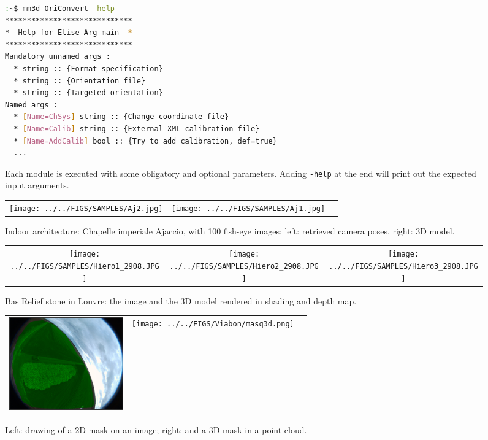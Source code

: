 \documentclass[twocolumn]{bmcart}%
\begin{document}
\begin{backmatter}
%
\footnotesize
\begin{figure}[h!]
\begin{lstlisting}[language=bash,frame=none]
:~$ mm3d OriConvert -help
*****************************
*  Help for Elise Arg main  *
*****************************
Mandatory unnamed args : 
  * string :: {Format specification}
  * string :: {Orientation file}
  * string :: {Targeted orientation}
Named args : 
  * [Name=ChSys] string :: {Change coordinate file}
  * [Name=Calib] string :: {External XML calibration file}
  * [Name=AddCalib] bool :: {Try to add calibration, def=true}
  ...
\end{lstlisting}
\caption{ {Each module is executed with some obligatory and optional parameters. Adding {\tt -help} at the end will print out the expected input arguments}.}\label{fig:help}
\end{figure}

\begin{figure}
 \begin{tabular}{c c c} 
 \texttt{[image: ../../FIGS/SAMPLES/Aj2.jpg]} &
 \texttt{[image: ../../FIGS/SAMPLES/Aj1.jpg]} &
  \end{tabular}
 \caption{{Indoor architecture: } Chapelle imperiale Ajaccio, with 100 fish-eye images;
 left: retrieved camera poses, right: 3D model.}\label{fig:fisheye}
 \end{figure}

\begin{figure}
 \begin{tabular}{c c c} 
    \texttt{[image: ../../FIGS/SAMPLES/Hiero1\_2908.JPG]} &
    \texttt{[image: ../../FIGS/SAMPLES/Hiero2\_2908.JPG]} &
    \texttt{[image: ../../FIGS/SAMPLES/Hiero3\_2908.JPG]} 
 \end{tabular}
 \caption{{ Bas Relief} stone in Louvre: the image and the 3D model rendered in shading and depth map.}\label{fig:basRelief}
 \end{figure}


%
\begin{figure}
 \begin{tabular}{c c c} 
 \includegraphics[height=40mm]{img/saisieMasq.png} &
 \texttt{[image: ../../FIGS/Viabon/masq3d.png]} &
  \end{tabular}
 \caption{ Left: drawing of a 2D mask on an image; right: and a 3D mask in a point cloud.}\label{fig:saisieMasq}
 \end{figure}
%


\end{backmatter}
\end{document}
